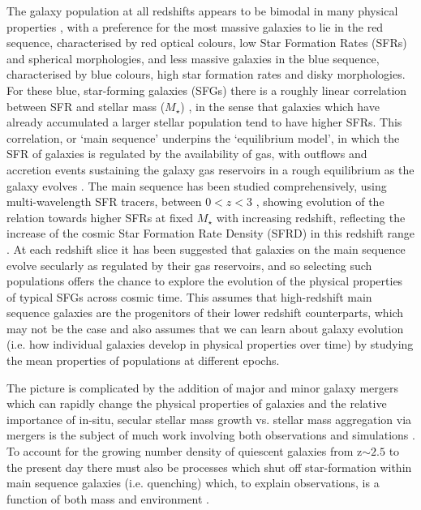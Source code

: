 \documentclass[fleqn,usenatbib]{mn2e}
\begin{document}
The galaxy population at all redshifts appears to be bimodal in many physical properties \citep[e.g. as described in][]{Dekel2006}, with a preference for the most massive galaxies to lie in the red sequence, characterised by red optical colours, low Star Formation Rates (SFRs) and spherical morphologies, and less massive galaxies in the blue sequence, characterised by blue colours, high star formation rates and disky morphologies. 
For these blue, star-forming galaxies (SFGs) there is a roughly linear correlation between SFR and stellar mass ($M_{\star}$) \citep[e.g.][]{Daddi2007,Noeske2007,Elbaz2007}, in the sense that galaxies which have already accumulated a larger stellar population tend to have higher SFRs.
This correlation, or `main sequence' underpins the `equilibrium model', in which the SFR of galaxies is regulated by the availability of gas, with outflows and accretion events sustaining the galaxy gas reservoirs in a rough equilibrium as the galaxy evolves \citep[e.g.][]{Dave2012,Lilly2013,Saintonge2013}.
The main sequence has been studied comprehensively, using multi-wavelength SFR tracers, between $0 < z < 3$ \citep[e.g.][]{Rodighiero2011,Karim2011,Whitaker2012,Behroozi2013b,Whitaker2014,Rodighiero2014,Speagle2014,Pannella2014,Sobral2014,Sparre2015,Lee2015,Schreiber2015,Renzini2015,Nelson2016}, showing evolution of the relation towards higher SFRs at fixed $M_{\star}$ with increasing redshift, reflecting the increase of the cosmic Star Formation Rate Density (SFRD) in this redshift range \citep{Madau_2014}.
At each redshift slice it has been suggested that galaxies on the main sequence evolve secularly as regulated by their gas reservoirs, and so selecting such populations offers the chance to explore the evolution of the physical properties of typical SFGs across cosmic time.
This assumes that high-redshift main sequence galaxies are the progenitors of their lower redshift counterparts, which may not be the case \citep[e.g.][]{Gladders2013,Kelson2014,Abramson2016b} and also assumes that we can learn about galaxy evolution (i.e. how individual galaxies develop in physical properties over time) by studying the mean properties of populations at different epochs. 

The picture is complicated by the addition of major and minor galaxy mergers which can rapidly change the physical properties of galaxies \citep[e.g.][]{Toomre1977,Lotz2008,Conselice2011,Conselice2014} and the relative importance of in-situ, secular stellar mass growth vs. stellar mass aggregation via mergers is the subject of much work involving both observations and simulations \citep[e.g.][]{Robaina2009,Kaviraj2012,Stott2013,Lofthouse2016,Qu2016}. 
To account for the growing number density of quiescent galaxies from z$\sim 2.5$ to the present day \citep[e.g.][]{Bell2004,Faber2007,Brown2007,Ilbert2010,Brammer2011,Muzzin2013,Buitrago2013} there must also be processes which shut off star-formation within main sequence galaxies (i.e. quenching) which, to explain observations, is a function of both mass and environment \citep{Peng2010,Darvish2016}.
\end{document}
